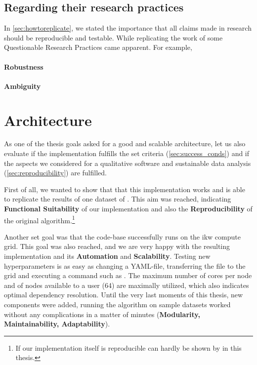 \subsection{Regarding their research practices}

In \autoref{sec:howtoreplicate}, we stated the importance that all claims made in research should be reproducible and testable. While replicating the work of \cite{Derrac2015}some Questionable Research Practices came apparent. For example, 



\paragraph{Robustness}
\todo

\paragraph{Ambiguity}
\todo








\section{Architecture}

As one of the thesis goals asked for a good and scalable architecture, let us also evaluate if the implementation fulfills the set criteria (\autoref{sec:success_conds}) and if the aspects we considered for a qualitative software and sustainable data analysis (\autoref{sec:reproducibility}) are fulfilled.

First of all, we wanted to show that that this implementation works and is able to replicate the results of one dataset of \mainalgos. This aim was reached, indicating \textbf{Functional Suitability} of our implementation and also the \textbf{Reproducibility} of the original algorithm.\footnote{If our implementation itself is reproducible can hardly be shown by \me in this thesis.}

Another set goal was that the code-base successfully runs on the \gls{ikw} compute grid. This goal was also reached, and we are very happy with the resulting implementation and its \textbf{Automation} and \textbf{Scalability}. Testing new hyperparameters is as easy as changing a YAML-file, transferring the file to the grid and executing a command such as . The maximum number of cores per node and of nodes available to a user (64) are maximally utilized, which also indicates optimal dependency resolution. Until the very last moments of this thesis, new components were added, running the algorithm on sample datasets worked without any complications in a matter of minutes (\textbf{Modularity, Maintainability, Adaptability}).

